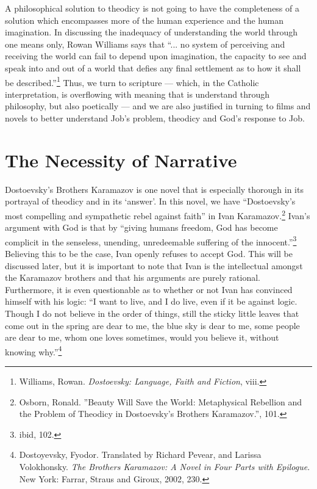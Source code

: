A philosophical solution to theodicy is not going to have the completeness of a solution which encompasses more of the human experience and the human imagination. In discussing the inadequacy of understanding the world through one means only, Rowan Williams says that ``... no system of perceiving and receiving the world can fail to depend upon imagination, the capacity to see and speak into and out of a world that defies any final settlement as to how it shall be described.''\footnote{Williams, Rowan. \emph{Dostoevsky: Language, Faith and Fiction}, viii.} Thus, we turn to scripture --- which, in the Catholic interpretation, is overflowing with meaning that is understand through philosophy, but also poetically --- and we are also justified in turning to films and novels to better understand Job's problem, theodicy and God's response to Job.

\section{The Necessity of Narrative}
Dostoevsky's Brothers Karamazov is one novel that is especially thorough in its portrayal of theodicy and in its `answer'. In this novel, we have ``Dostoevsky's most compelling and sympathetic rebel against faith'' in Ivan Karamazov.\footnote{Osborn, Ronald. ''Beauty Will Save the World: Metaphysical Rebellion and the Problem of Theodicy in Dostoevsky's Brothers Karamazov.'', 101.} Ivan's argument with God is that by ``giving humans freedom, God has become complicit in the senseless, unending, unredeemable suffering of the innocent.''\footnote{ibid, 102.} Believing this to be the case, Ivan openly refuses to accept God. This will be discussed later, but it is important to note that Ivan is the intellectual amongst the Karamazov brothers and that his arguments are purely rational. Furthermore, it is even questionable as to whether or not Ivan has convinced himself with his logic: 
``I want to live, and I do live, even if it be against logic. Though I do not believe in the order of things, still the sticky little leaves that come out in the spring are dear to me, the blue sky is dear to me, some people are dear to me, whom one loves sometimes, would you believe it, without knowing why.''\footnote{Dostoyevsky, Fyodor. Translated by Richard Pevear, and Larissa Volokhonsky. \emph{The Brothers Karamazov: A Novel in Four Parts with Epilogue}. New York: Farrar, Straus and Giroux, 2002, 230.}

